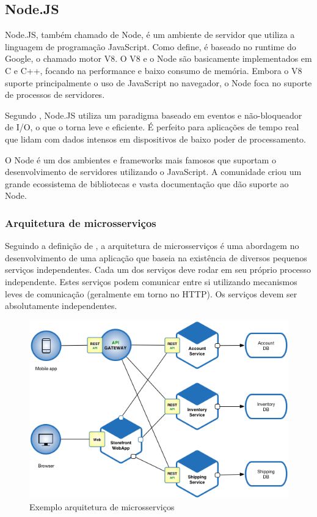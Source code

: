 \subsection{Node.JS}

Node.JS, também chamado de Node, é um ambiente de servidor que utiliza a linguagem de programação JavaScript. Como \cite{Tilkov2010} define, é baseado no runtime do Google, o chamado motor V8. O V8 e o Node são basicamente implementados em C e C++, focando na performance e baixo consumo de memória. Embora o V8 suporte principalmente o uso de JavaScript no navegador, o Node foca no suporte de processos de servidores.

Segundo \cite{Sapes2016}, Node.JS utiliza um paradigma baseado em eventos e não-bloqueador de I/O, o que o torna leve e eficiente. É perfeito para aplicações de tempo real que lidam com dados intensos em dispositivos de baixo poder de processamento.

O Node é um dos ambientes e frameworks mais famosos que suportam o desenvolvimento de servidores utilizando o JavaScript. A comunidade criou um grande ecossistema de bibliotecas e vasta documentação que dão suporte ao Node. \cite{Tilkov2010}

\subsubsection{Arquitetura de microsserviços}

Seguindo a definição de \cite{ms1}, a arquitetura de microsserviços é uma abordagem no desenvolvimento de uma aplicação que baseia na existência de diversos pequenos serviços independentes. Cada um dos serviços deve rodar em seu próprio processo independente. Estes serviços podem comunicar entre si utilizando mecanismos leves de comunicação (geralmente em torno no HTTP). Os serviços devem ser absolutamente independentes.

\begin{figure}[htbp]
	\centering
	\includegraphics[width=1\linewidth]{figuras/Microservice_Architecture.png}
	\caption{Exemplo arquitetura de microsserviços}
	\label{fig:arquitetura-microsservicos}
\end{figure}

